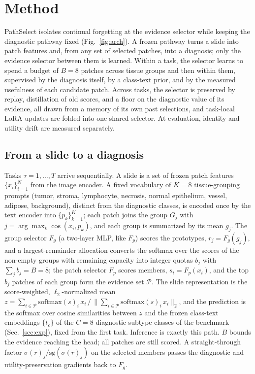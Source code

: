 \documentclass{article}
\newcommand{\Fg}{F_g}
\newcommand{\Fp}{F_p}
\newcommand{\Psel}{\mathcal{P}}
\begin{document}
\section{Method}
\label{sec:method}

PathSelect isolates continual forgetting at the evidence selector while keeping the diagnostic pathway fixed (Fig.~\ref{fig:arch}). A frozen pathway turns a slide into patch features and, from any set of selected patches, into a diagnosis; only the evidence selector between them is learned. Within a task, the selector learns to spend a budget of $B=8$ patches across tissue groups and then within them, supervised by the diagnosis itself, by a class-text prior, and by the measured usefulness of each candidate patch. Across tasks, the selector is preserved by replay, distillation of old scores, and a floor on the diagnostic value of its evidence, all drawn from a memory of its own past selections, and task-local LoRA updates are folded into one shared selector. At evaluation, identity and utility drift are measured separately.

\subsection{From a slide to a diagnosis}
\label{ssec:setup}

Tasks $\tau=1,\ldots,T$ arrive sequentially. A slide is a set of frozen patch features $\{x_i\}_{i=1}^{N}$ from the image encoder. A fixed vocabulary of $K=8$ tissue-grouping prompts (tumor, stroma, lymphocyte, necrosis, normal epithelium, vessel, adipose, background), distinct from the diagnostic classes, is encoded once by the text encoder into $\{p_k\}_{k=1}^{K}$; each patch joins the group $G_j$ with $j=\arg\max_k\cos(x_i,p_k)$, and each group is summarized by its mean $g_j$. The group selector $\Fg$ (a two-layer MLP, like $\Fp$) scores the prototypes, $r_j=\Fg(g_j)$, and a largest-remainder allocation converts the softmax over the scores of the non-empty groups with remaining capacity into integer quotas $b_j$ with $\sum_j b_j=B=8$; the patch selector $\Fp$ scores members, $s_i=\Fp(x_i)$, and the top $b_j$ patches of each group form the evidence set $\Psel$. The slide representation is the score-weighted, $\ell_2$-normalized mean $z=\sum_{i\in\Psel}\mathrm{softmax}(s)_i\,x_i\,/\,\bigl\|\sum_{i\in\Psel}\mathrm{softmax}(s)_i\,x_i\bigr\|_2$, and the prediction is the softmax over cosine similarities between $z$ and the frozen class-text embeddings $\{t_c\}$ of the $C=8$ diagnostic subtype classes of the benchmark (Sec.~\ref{sec:exp}), fixed from the first task. Inference is exactly this path. $B$ bounds the evidence reaching the head; all patches are still scored. A straight-through factor $\sigma(r)_j/\mathrm{sg}(\sigma(r)_j)$ on the selected members passes the diagnostic and utility-preservation gradients back to $\Fg$.
\end{document}

